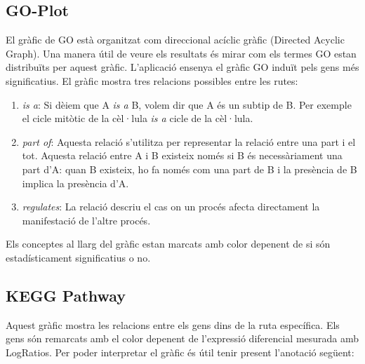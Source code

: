 \subsection{\gls{GO-Plot}}

El gràfic de \gls{GO} està organitzat com direccional acíclic gràfic (Directed Acyclic Graph). Una manera útil de veure els resultats és mirar com els termes \gls{GO} estan distribuïts per aquest gràfic. L'aplicació ensenya el gràfic \gls{GO} induït pels gens més significatius. El gràfic mostra tres relacions possibles entre les rutes: 
\begin{enumerate}
\item \textit{is a}: Si dèiem que A \textit{is a} B, volem dir que A és un subtip de B. Per exemple el cicle mitòtic de la cèl·lula \textit{is a} cicle de la cèl·lula. 
\item \textit{part of}: Aquesta relació s'utilitza per representar la relació entre una part i el tot. Aquesta relació entre A i B existeix només si B és necessàriament una part d'A: quan B existeix, ho fa només com una part de B i la presència de B implica la presència d’A.
\item \textit{regulates}: La relació descriu el cas on un procés afecta directament la manifestació de l'altre procés.
\end{enumerate}

Els conceptes al llarg del gràfic estan marcats amb color depenent de si són estadísticament significatius o no.

\subsection{\gls{KEGG Pathway}}
Aquest gràfic mostra les relacions entre els gens dins de la ruta específica. Els gens són remarcats amb el color depenent de l'expressió diferencial mesurada amb LogRatios. Per poder interpretar el gràfic és útil tenir present l'anotació següent:

